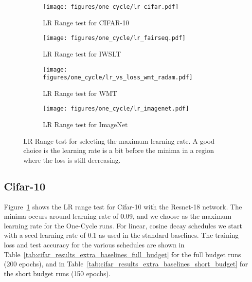 \documentclass{article} \usepackage{iclr2021_conference,times}
\begin{document}
\begin{figure}[t]
    \centering
    \begin{subfigure}[t]{0.49\textwidth}
        \centering
        \texttt{[image: figures/one\_cycle/lr\_cifar.pdf]}
        \caption{LR Range test for CIFAR-10}
        \label{fig:lr_range_test_cifar}
    \end{subfigure} \hfill
    \begin{subfigure}[t]{0.49\textwidth}
        \centering
        \texttt{[image: figures/one\_cycle/lr\_fairseq.pdf]}
        \caption{LR Range test for IWSLT}
        \label{fig:lr_range_test_iwslt}
    \end{subfigure}
    \begin{subfigure}[t]{0.49\textwidth}
        \centering
        \texttt{[image: figures/one\_cycle/lr\_vs\_loss\_wmt\_radam.pdf]}
        \caption{LR Range test for WMT}
        \label{fig:lr_range_test_WMT}
    \end{subfigure} \hfill
    \begin{subfigure}[t]{0.49\textwidth}
        \centering
        \texttt{[image: figures/one\_cycle/lr\_imagenet.pdf]}
        \caption{LR Range test for ImageNet}
        \label{fig:lr_range_test_imagenet}
    \end{subfigure}
\caption{LR Range test for selecting the maximum learning rate. A good choice is the learning rate is a bit before the minima in a region where the loss is still decreasing.}
\label{fig:lr_range_tests}
\end{figure}

\subsection{Cifar-10}
Figure~\ref{fig:lr_range_test_cifar}  shows the LR range test for Cifar-10 with the Resnet-18 network. The minima occurs around learning rate of 0.09, and we choose  as the maximum learning rate for the One-Cycle runs. For linear, cosine decay schedules we start with a seed learning rate of 0.1 as used in the standard baselines. The training loss and test accuracy for the various schedules are shown in Table~\ref{tab:cifar_results_extra_baselines_full_budget} for the full budget runs (200 epochs), and in Table~\ref{tab:cifar_results_extra_baselines_short_budget} for the short budget runs (150 epochs).
\end{document}
